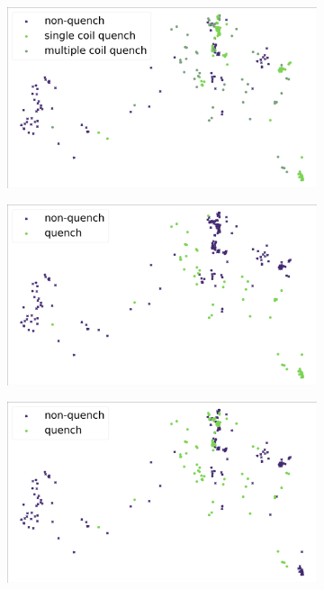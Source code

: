 \begin{figure}[!h]
	\centering
	\begin{subfigure}{\linewidth}
		\includegraphics[width=\linewidth]{img/quench_dist_qlp/single_vs_multiple_Phi.png}
		\subcaption{}
	\end{subfigure}
	\begin{subfigure}{0.49\linewidth}
		\includegraphics[width=\linewidth]{img/quench_dist_qlp/quenches_coil_0_Phi.png}
		\subcaption{}
	\end{subfigure}
	\begin{subfigure}{0.49\linewidth}
		\includegraphics[width=\linewidth]{img/quench_dist_qlp/quenches_coil_1_Phi.png}

\end{subfigure}
\end{figure}
